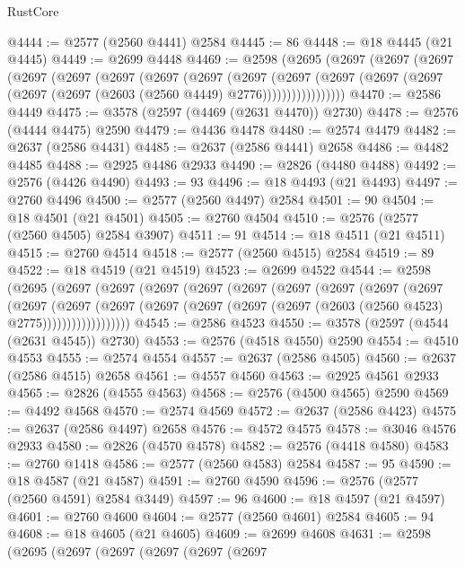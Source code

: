\begin{lexlean}{RustCore}
\begin{coremodule}
@4444 := @2577 (@2560 @4441) @2584
@4445 := 86
@4448 := @18 @4445 (@21 @4445)
@4449 := @2699 @4448
@4469 := @2598
    (@2695
      (@2697
        (@2697
          (@2697
            (@2697
              (@2697
                (@2697
                  (@2697
                    (@2697
                      (@2697
                        (@2697
                          (@2697
                            (@2697 (@2697 (@2697 (@2697 (@2603 (@2560 @4449) @2776)))))))))))))))))
@4470 := @2586 @4449
@4475 := @3578 (@2597 (@4469 (@2631 @4470)) @2730)
@4478 := @2576 (@4444 @4475) @2590
@4479 := @4436 @4478
@4480 := @2574 @4479
@4482 := @2637 (@2586 @4431)
@4485 := @2637 (@2586 @4441) @2658
@4486 := @4482 @4485
@4488 := @2925 @4486 @2933
@4490 := @2826 (@4480 @4488)
@4492 := @2576 (@4426 @4490)
@4493 := 93
@4496 := @18 @4493 (@21 @4493)
@4497 := @2760 @4496
@4500 := @2577 (@2560 @4497) @2584
@4501 := 90
@4504 := @18 @4501 (@21 @4501)
@4505 := @2760 @4504
@4510 := @2576 (@2577 (@2560 @4505) @2584 @3907)
@4511 := 91
@4514 := @18 @4511 (@21 @4511)
@4515 := @2760 @4514
@4518 := @2577 (@2560 @4515) @2584
@4519 := 89
@4522 := @18 @4519 (@21 @4519)
@4523 := @2699 @4522
@4544 := @2598
    (@2695
      (@2697
        (@2697
          (@2697
            (@2697
              (@2697
                (@2697
                  (@2697
                    (@2697
                      (@2697
                        (@2697
                          (@2697
                            (@2697
                              (@2697
                                (@2697 (@2697 (@2697 (@2603 (@2560 @4523) @2775))))))))))))))))))
@4545 := @2586 @4523
@4550 := @3578 (@2597 (@4544 (@2631 @4545)) @2730)
@4553 := @2576 (@4518 @4550) @2590
@4554 := @4510 @4553
@4555 := @2574 @4554
@4557 := @2637 (@2586 @4505)
@4560 := @2637 (@2586 @4515) @2658
@4561 := @4557 @4560
@4563 := @2925 @4561 @2933
@4565 := @2826 (@4555 @4563)
@4568 := @2576 (@4500 @4565) @2590
@4569 := @4492 @4568
@4570 := @2574 @4569
@4572 := @2637 (@2586 @4423)
@4575 := @2637 (@2586 @4497) @2658
@4576 := @4572 @4575
@4578 := @3046 @4576 @2933
@4580 := @2826 (@4570 @4578)
@4582 := @2576 (@4418 @4580)
@4583 := @2760 @1418
@4586 := @2577 (@2560 @4583) @2584
@4587 := 95
@4590 := @18 @4587 (@21 @4587)
@4591 := @2760 @4590
@4596 := @2576 (@2577 (@2560 @4591) @2584 @3449)
@4597 := 96
@4600 := @18 @4597 (@21 @4597)
@4601 := @2760 @4600
@4604 := @2577 (@2560 @4601) @2584
@4605 := 94
@4608 := @18 @4605 (@21 @4605)
@4609 := @2699 @4608
@4631 := @2598
    (@2695
      (@2697
        (@2697
          (@2697
            (@2697
              (@2697

\end{coremodule}
\end{lexlean}
